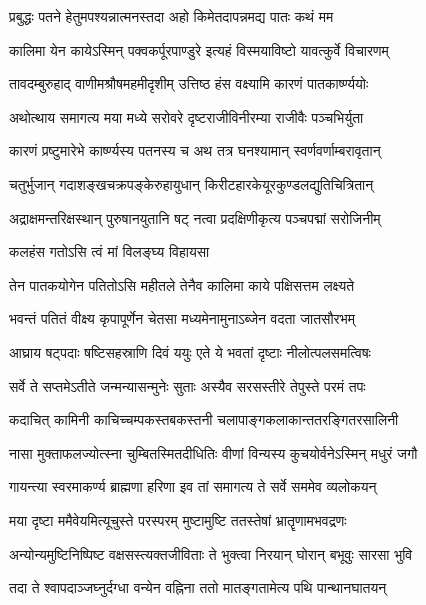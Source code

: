 \twolineshloka
{प्रबुद्धः पतने हेतुमपश्यन्नात्मनस्तदा}
{अहो किमेतदापन्नमद्य पातः कथं मम} %

\twolineshloka
{कालिमा येन कायेऽस्मिन् पक्वकर्पूरपाण्डुरे}
{इत्यहं विस्मयाविष्टो यावत्कुर्वे विचारणम्} %

\twolineshloka
{तावदम्बुरुहाद् वाणीमश्रौषमहमीदृशीम्}
{उत्तिष्ठ हंस वक्ष्यामि कारणं पातकार्ष्ण्ययोः} %

\twolineshloka
{अथोत्थाय समागत्य मया मध्ये सरोवरे}
{दृष्टराजीविनीरम्या राजीवैः पञ्चभिर्युता} %

\twolineshloka
{कारणं प्रष्टुमारेभे कार्ष्ण्यस्य पतनस्य च}
{अथ तत्र घनश्यामान् स्वर्णवर्णाम्बरावृतान्} %

\twolineshloka
{चतुर्भुजान् गदाशङ्खचक्रपङ्केरुहायुधान्}
{किरीटहारकेयूरकुण्डलद्युतिचित्रितान्} %

\twolineshloka
{अद्राक्षमन्तरिक्षस्थान् पुरुषानयुतानि षट्}
{नत्वा प्रदक्षिणीकृत्य पञ्चपद्मां सरोजिनीम्} %



\onelineshloka
{कलहंस गतोऽसि त्वं मां विलङ्घ्य विहायसा} %

\twolineshloka
{तेन पातकयोगेन पतितोऽसि महीतले}
{तेनैव कालिमा काये पक्षिसत्तम लक्ष्यते} %

\twolineshloka
{भवन्तं पतितं वीक्ष्य कृपापूर्णेन चेतसा}
{मध्यमेनामुनाऽब्जेन वदता जातसौरभम्} %

\twolineshloka
{आघ्राय षट्पदाः षष्टिसहस्राणि दिवं ययुः}
{एते ये भवतां दृष्टाः नीलोत्पलसमत्विषः} %

\twolineshloka
{सर्वे ते सप्तमेऽतीते जन्मन्यासन्मुनेः सुताः}
{अस्यैव सरसस्तीरे तेपुस्ते परमं तपः} %

\twolineshloka
{कदाचित् कामिनी काचिच्चम्पकस्तबकस्तनी}
{चलापाङ्गकलाकान्ततरङ्गितरसालिनी} %

\twolineshloka
{नासा मुक्ताफलज्योत्स्ना चुम्बितस्मितदीधितिः}
{वीणां विन्यस्य कुचयोर्वनेऽस्मिन् मधुरं जगौ} %

\twolineshloka
{गायन्त्या स्वरमाकर्ण्य ब्राह्मणा हरिणा इव}
{तां समागत्य ते सर्वे सममेव व्यलोकयन्} %

\twolineshloka
{मया दृष्टा ममैवेयमित्यूचुस्ते परस्परम्}
{मुष्टामुष्टि ततस्तेषां भ्रातॄणामभवद्रणः} %

\twolineshloka
{अन्योन्यमुष्टिनिष्पिष्ट वक्षसस्त्यक्तजीविताः}
{ते भुक्त्वा निरयान् घोरान् बभूवुः सारसा भुवि} %

\twolineshloka
{तदा ते श्वापदाञ्जघ्नुर्दग्धा वन्येन वह्निना}
{ततो मातङ्गतामेत्य पथि पान्थानघातयन्} %

